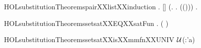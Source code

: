 \newcommand{\HOLsubstitutionTheoremsokXXtoXXunrollXXnu}{\UseVerbatim{HOLsubstitutionTheoremsokXXtoXXunrollXXnu}}
\begin{SaveVerbatim}{HOLsubstitutionTheoremspairXXlistXXinduction}
\HOLTokenTurnstile{} \HOLSymConst{\HOLTokenForall{}}.  [] \HOLSymConst{\HOLTokenConj{}} (\HOLSymConst{\HOLTokenForall{}}.   \HOLSymConst{\HOLTokenImp{}} \HOLSymConst{\HOLTokenForall{}} .  ((\HOLSymConst{,})\HOLSymConst{::})) \HOLSymConst{\HOLTokenImp{}} \HOLSymConst{\HOLTokenForall{}}.  
\end{SaveVerbatim}
\newcommand{\HOLsubstitutionTheoremspairXXlistXXinduction}{\UseVerbatim{HOLsubstitutionTheoremspairXXlistXXinduction}}
\begin{SaveVerbatim}{HOLsubstitutionTheoremssetsatXXEQXXsatFun}
\HOLTokenTurnstile{} \HOLSymConst{\HOLTokenForall{}}    .
        (   ) \HOLSymConst{=}      
\end{SaveVerbatim}
\newcommand{\HOLsubstitutionTheoremssetsatXXEQXXsatFun}{\UseVerbatim{HOLsubstitutionTheoremssetsatXXEQXXsatFun}}
\begin{SaveVerbatim}{HOLsubstitutionTheoremssetsatXXisXXmmfnXXUNIV}
\HOLTokenTurnstile{}     \HOLSymConst{=}    \ensuremath{\cal{U}}(:'a) 
\end{SaveVerbatim}
\newcommand{\HOLsubstitutionTheoremssetsatXXisXXmmfnXXUNIV}{\UseVerbatim{HOLsubstitutionTheoremssetsatXXisXXmmfnXXUNIV}}

